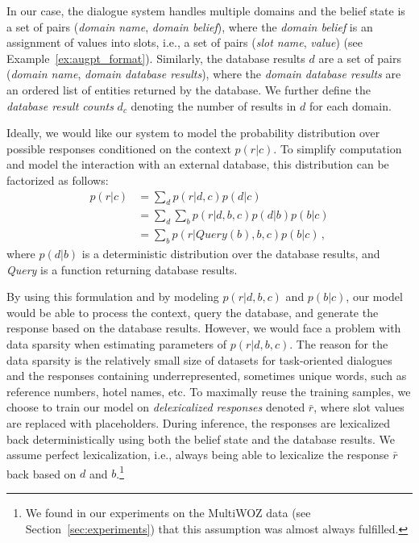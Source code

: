 \documentclass[11pt,a4paper]{article}
\newcommand{\exampleref}[1]{Example~\ref{#1}}
\begin{document}
In our case, the dialogue system handles multiple domains and the belief state is a set of pairs (\emph{domain name}, \emph{domain belief}), where the \emph{domain belief} is an assignment of values into slots, i.e., a set of pairs (\textit{slot name}, \textit{value}) (see \exampleref{ex:augpt_format}). Similarly, the database results $d$ are a set of pairs (\textit{domain name}, \textit{domain database results}), where the \textit{domain database results} are an ordered list of entities returned by the database. We further define the \emph{database result counts} $d_c$ denoting the number of results in $d$ for each domain.

Ideally, we would like our system to model the probability distribution over possible responses conditioned on the context $p(r|c)$. To simplify computation and model the interaction with an external database, this distribution can be factorized as follows:
\begin{equation}
\begin{split}
    p(r|c) &= \sum_{d} p(r|d,c) p(d|c) \\
           &= \sum_{d} \sum_{b} p(r|d,b,c) p(d|b) p(b|c) \\
           &= \sum_{b} p(r|\textit{Query}(b),b,c) p(b|c)\,,
\end{split}
\end{equation}
where $p(d|b)$ is a deterministic distribution over the database results, and \textit{Query} is a function returning database results.

By using this formulation and by modeling $p(r|d,b,c)$ and $p(b|c)$, our model would be able to process the context, query the database, and generate the response based on the database results. However, we would face a problem with data sparsity when estimating parameters of $p(r|d,b,c)$. The reason for the data sparsity is the relatively small size of datasets for task-oriented dialogues and the responses containing underrepresented, sometimes unique words, such as reference numbers, hotel names, etc. To maximally reuse the training samples, we choose to train our model on \emph{delexicalized responses} \cite{wen2015} denoted $\bar{r}$, where slot values are replaced with placeholders. During inference, the responses are lexicalized back deterministically using both the belief state and the database results. We assume perfect lexicalization, i.e., always being able to lexicalize the response $\bar{r}$ back based on $d$ and $b$.\footnote{We found in our experiments on the MultiWOZ data (see Section~\ref{sec:experiments}) that this assumption was almost always fulfilled.}
\end{document}
